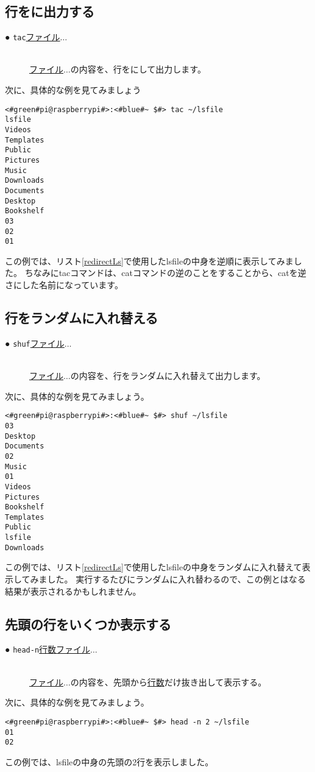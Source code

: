 \subsection{行をに出力する}
\begin{description}
    \item[● \texttt{tac}\textvisiblespace \underline{ファイル}$\ldots$]\mbox{}\\
    \underline{ファイル}$\ldots$の内容を、行をにして出力します。
\end{description}
次に、具体的な例を見てみましょう
\begin{lstlisting}[caption=tacコマンドの実行例, label=tac_example]
<#green#pi@raspberrypi#>:<#blue#~ $#> tac ~/lsfile
lsfile
Videos
Templates
Public
Pictures
Music
Downloads
Documents
Desktop
Bookshelf
03
02
01 
\end{lstlisting}
この例では、リスト\ref{redirectLs}で使用したlsfileの中身を逆順に表示してみました。
ちなみにtacコマンドは、catコマンドの逆のことをすることから、catを逆さにした名前になっています。


\subsection{行をランダムに入れ替える}
\begin{description}
    \item[● \texttt{shuf}\textvisiblespace \underline{ファイル}$\ldots$]\mbox{}\\
    \underline{ファイル}$\ldots$の内容を、行をランダムに入れ替えて出力します。
\end{description}
次に、具体的な例を見てみましょう。
\begin{lstlisting}[caption=shufコマンドの実行例, label=shuf_example]
<#green#pi@raspberrypi#>:<#blue#~ $#> shuf ~/lsfile
03
Desktop
Documents
02
Music
01
Videos
Pictures
Bookshelf
Templates
Public
lsfile
Downloads
\end{lstlisting}
この例では、リスト\ref{redirectLs}で使用したlsfileの中身をランダムに入れ替えて表示してみました。
実行するたびにランダムに入れ替わるので、この例とはなる結果が表示されるかもしれません。

\subsection{先頭の行をいくつか表示する}
\begin{description}
    \item[● \texttt{head}\textvisiblespace \texttt{-n}\textvisiblespace \underline{行数}\textvisiblespace \underline{ファイル}$\ldots$ ]\mbox{}\\
    \underline{ファイル}$\ldots$の内容を、先頭から\underline{行数}だけ抜き出して表示する。
\end{description}
次に、具体的な例を見てみましょう。
\begin{lstlisting}[caption=headコマンドの実行例, label=shuf_example]
<#green#pi@raspberrypi#>:<#blue#~ $#> head -n 2 ~/lsfile
01
02
\end{lstlisting}
この例では、lsfileの中身の先頭の2行を表示しました。

